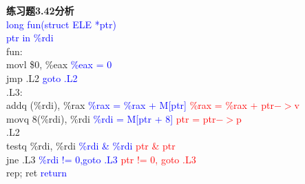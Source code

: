 \documentclass{article}
\newcommand{\blue}[1]{\textcolor{blue}{#1}}
\newcommand{\red}[1]{\textcolor{red}{#1}}
\begin{document}
\begin{CJK}{UTF8}{gbsn}
\textbf{练习题3.42分析}	\\
\blue{long fun(struct ELE *ptr)}	\\
\blue{ptr in \%rdi}	\\
fun:	\\
	\hspace*{1em}movl	\$0, \%eax	\blue{\%eax = 0}	\\
	\hspace*{1em}jmp	.L2		\blue{goto .L2}		\\
.L3:	\\
	\hspace*{1em}addq	(\%rdi), \%rax	\blue{\%rax = \%rax + M[ptr]}	\red{\%rax = \%rax + ptr$->$v}	\\
	\hspace*{1em}movq	8(\%rdi), \%rdi	\blue{\%rdi = M[ptr + 8]}	\red{ptr = ptr$->$p}	\\
.L2	\\
	\hspace*{1em}testq	\%rdi, \%rdi	\blue{\%rdi \& \%rdi}	\red{ptr \& ptr}	\\
	\hspace*{1em}jne	.L3	\blue{\%rdi != 0,goto .L3}	\red{ptr != 0, goto .L3}	\\
	\hspace*{1em}rep; ret		\blue{return}	\\


\end{CJK}
\end{document}
